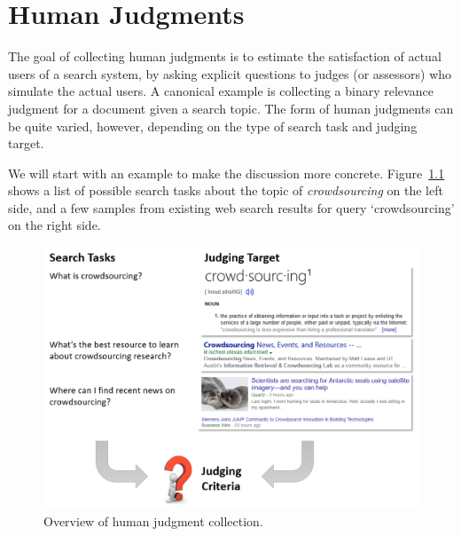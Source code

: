 
\chapter{Human Judgments}
\label{c-human-judgment}

The goal of collecting human judgments is to estimate the satisfaction of actual users of a search system, by asking explicit questions to judges (or assessors) who simulate the actual users.
A canonical example is collecting a binary relevance judgment for a document given a  search topic. The form of human judgments can be quite varied, however, depending on the type of search task and judging target.

We will start with an example to make the discussion more concrete. Figure~\ref{fig:human_judgment_overview} shows a list of possible search tasks about the topic of \textit{crowdsourcing} on the left side, and a few samples from existing web search results for query `crowdsourcing' on the right side.


\begin{figure}
	\begin{center}
		\includegraphics[scale=0.5]{images/human_judgment_overview}
		\caption{Overview of human judgment collection.} 
		\label{fig:human_judgment_overview}
	\end{center}
\end{figure}


